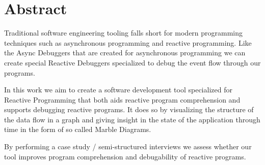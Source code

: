 \section{Abstract} 
Traditional software engineering tooling falls short for modern programming 
techniques such as asynchronous programming and reactive programming. Like 
the Async Debuggers that are created for asynchronous programming we can create
special Reactive Debuggers specialized to debug the event flow through our programs.

In this work we aim to create a software development tool specialized for Reactive Programming
that both aids reactive program comprehension and supports debugging reactive programs. 
It does so by visualizing the structure of the data flow in a graph and giving insight in 
the state of the application through time in the form of so called Marble Diagrams.

By performing a case study / semi-structured interviews we assess whether our tool
improves program comprehension and debugability of reactive programs.







